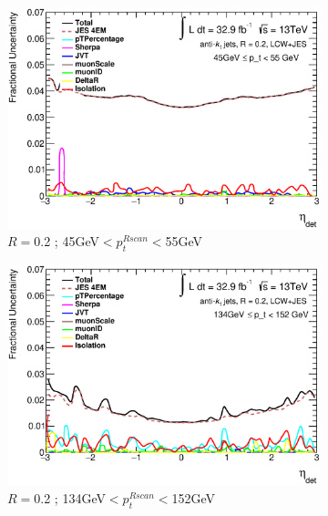 \begin{figure}[ht]
    \centering
    \begin{subfigure}[b]{0.495\textwidth}
        \centering
        \includegraphics[width=\textwidth]{images/SumIn2_pT_4_2LC_wContributions.eps}
        \caption{$R=$0.2 ; 45GeV$<p_t^{Rscan}<$55GeV}
    \end{subfigure}
    \hfill
    \begin{subfigure}[b]{0.495\textwidth}
        \centering
        \includegraphics[width=\textwidth]{images/SumIn2_pT_10_2LC_wContributions.eps}
        \caption{$R=$0.2 ; 134GeV$<p^{Rscan}_t<$152GeV}
    \end{subfigure}
    \vfill
    \begin{subfigure}[b]{0.495\textwidth}

\end{subfigure}
\end{figure}
